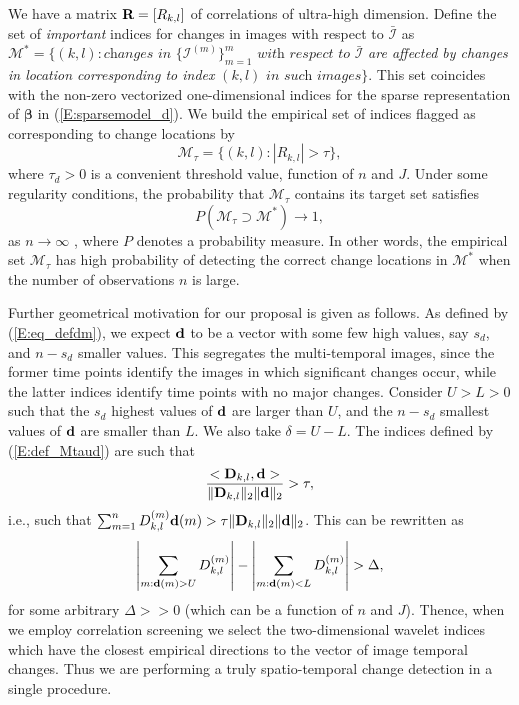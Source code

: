 \documentclass[journal]{IEEEtran}
\newcommand{\vbeta}{\pmb{\beta}}
\newcommand{\vD}{{\textbf D}}
\newcommand{\vd}{{\textbf d}}
\newcommand{\vR}{{\textbf R}}
\begin{document}
We have a matrix $\vR=[R_{k,l}]$ of correlations of ultra-high dimension. Define the set of 
{\it important} indices for changes in images with respect to $\bar{\mathcal I}$ as 
$\mathcal{M}^{*}=\{(k,l): \textit{changes in } \{\mathcal{I}^{(m)}\}_{m=1}^m \textit{ with respect to}$ $\bar{\mathcal{I}}$ \textit{are affected by changes in location corresponding to index} $(k,l)$ $\textit{in such images}\}$.  This set coincides with the non-zero vectorized one-dimensional indices for the sparse representation of $\vbeta$ in (\ref{E:sparsemodel_d}). 
We build the empirical set of indices flagged as corresponding to change locations by
\begin{equation}
\mathcal{M}_{\tau}=\{(k,l):|R_{k,l}|>\tau\},
\label{E:def_Mtaud}
\end{equation}
where $\tau_d>0$ is a convenient threshold value, function of $n$ and $J$. Under some regularity conditions, the probability that $\mathcal{M}_{\tau}$ contains its target set satisfies
\[
P(\mathcal{M}_{\tau}\supset\mathcal{M}^{*})\rightarrow 1,
\]
as $n\rightarrow\infty$ \cite{fan2020statistical}, where $P$ denotes a probability measure. In other words, the empirical set $\mathcal{M}_{\tau}$ has high probability of detecting the correct change locations in $\mathcal{M}^{*}$ when the number of observations $n$ is large.

Further geometrical motivation for our proposal is given as follows. As defined by (\ref{E:eq_defdm}), we expect $\vd$ to be a vector with some few high values, say $s_d$, and $n-s_d$ smaller values. This segregates the multi-temporal images, since the former time points identify the images in which significant changes occur, while the latter indices identify time points with no major changes. Consider $U>L>0$ such that the $s_d$ highest values of $\vd$ are larger than $U$, and the $n-s_d$ smallest values of $\vd$ are smaller than $L$. We also take $\delta=U-L$. The indices defined by  (\ref{E:def_Mtaud}) are such that   
\[
\frac{<\vD_{k,l},\vd>}{\|\vD_{k,l}\|_2\|\vd\|_2}>\tau,
\]
i.e., such that  $\sum_{m=1}^nD_{k,l}^{(m)}\vd(m)>\tau\|\vD_{k,l}\|_2\|\vd\|_2$. This can be rewritten as
\[
\left|\sum_{m:\vd(m)>U} D_{k,l}^{(m)}\right|-\left|\sum_{m:\vd(m)<L} D_{k,l}^{(m)}\right|>\Delta,
\]
for some arbitrary $\Delta>>0$ (which can be a function of $n$ and $J$). Thence, when we employ correlation screening we select the two-dimensional wavelet indices which have the closest empirical directions to the vector of image temporal changes. Thus we are performing a truly spatio-temporal change detection in a single procedure.
\end{document}
